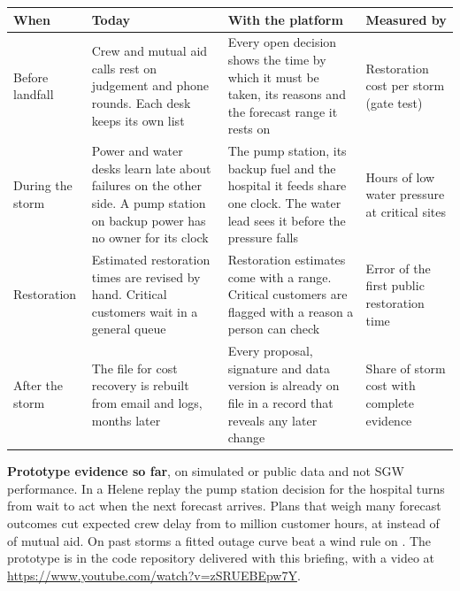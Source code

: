 \documentclass[fontsize=10pt,a4paper,DIV=12,parskip=half-,numbers=noenddot,headsepline,captions=tableheading]{scrartcl}
\begin{document}
\par\noindent\begin{minipage}{\linewidth}\centering\footnotesize
  \label{tab:value}
  \begin{tabularx}{\textwidth}{@{}L{1.9cm} Y Y L{3.2cm}@{}}
    \toprule
    \textbf{When} & \textbf{Today} & \textbf{With the platform} & \textbf{Measured by} \\ \midrule
    Before landfall & Crew and mutual aid calls rest on judgement and phone rounds. Each desk keeps its own list & Every open decision shows the time by which it must be taken, its reasons and the forecast range it rests on & Restoration cost per storm (gate test) \\ \lightrowrule
    During the storm & Power and water desks learn late about failures on the other side. A pump station on backup power has no owner for its clock & The pump station, its backup fuel and the hospital it feeds share one clock. The water lead sees it before the pressure falls & Hours of low water pressure at critical sites \\ \lightrowrule
    Restoration & Estimated restoration times are revised by hand. Critical customers wait in a general queue & Restoration estimates come with a range. Critical customers are flagged with a reason a person can check & Error of the first public restoration time \\ \lightrowrule
    After the storm & The file for cost recovery is rebuilt from email and logs, months later & Every proposal, signature and data version is already on file in a record that reveals any later change & Share of storm cost with complete evidence \\ \bottomrule
  \end{tabularx}
\end{minipage}\par

\textbf{Prototype evidence so far}, on simulated or public data and not SGW performance. In a Helene replay the pump station decision for the hospital turns from wait to act when the next forecast arrives. Plans that weigh many forecast outcomes cut expected crew delay from  to  million customer hours, at  instead of  of mutual aid. On  past storms a fitted outage curve beat a wind rule on . The prototype is in the code repository delivered with this briefing, with a video at \url{https://www.youtube.com/watch?v=zSRUEBEpw7Y}.
\end{document}
